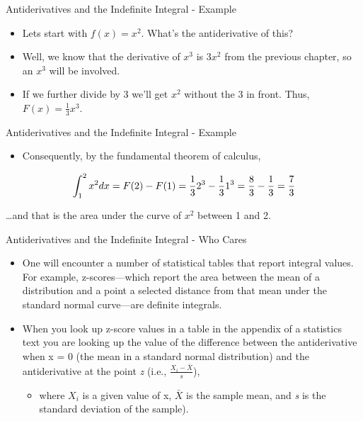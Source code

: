 \documentclass[
  ignorenonframetext,
]{beamer}
\providecommand{\tightlist}{%
  \setlength{\itemsep}{0pt}\setlength{\parskip}{0pt}}
\begin{document}
\begin{frame}{Antiderivatives and the Indefinite Integral - Example}
\protect\hypertarget{antiderivatives-and-the-indefinite-integral---example}{}

\begin{itemize}
\item
  Lets start with \(f(x) = x^{2}\). What's the antiderivative of this?
\item
  Well, we know that the derivative of \(x^{3}\) is \(3x^{2}\) from the
  previous chapter, so an \(x^{3}\) will be involved.
\item
  If we further divide by 3 we'll get \(x^{2}\) without the 3 in front.
  Thus, \(F(x) = \frac{1}{3}x^{3}\).
\end{itemize}

\end{frame}

\begin{frame}{Antiderivatives and the Indefinite Integral - Example}
\protect\hypertarget{antiderivatives-and-the-indefinite-integral---example-1}{}

\begin{itemize}
\tightlist
\item
  Consequently, by the fundamental theorem of calculus,
\end{itemize}

\[\int_{1}^{2}x^{2}dx = F(2) - F(1) = \\
\frac{1}{3}2^{3} - \frac{1}{3}1^{3} = \\
\frac{8}{3}- \frac{1}{3} = \frac{7}{3}\]

\ldots and that is the area under the curve of \(x^{2}\) between 1 and
2.

\end{frame}

\begin{frame}{Antiderivatives and the Indefinite Integral - Who Cares}
\protect\hypertarget{antiderivatives-and-the-indefinite-integral---who-cares}{}

\begin{itemize}
\item
  One will encounter a number of statistical tables that report integral
  values. For example, z-scores---which report the area between the mean
  of a distribution and a point a selected distance from that mean under
  the standard normal curve---are definite integrals.
\item
  When you look up z-score values in a table in the appendix of a
  statistics text you are looking up the value of the difference between
  the antiderivative when x = 0 (the mean in a standard normal
  distribution) and the antiderivative at the point \emph{z} (i.e.,
  \(\frac{X_{i} -\bar{X}}{s}\)),

  \begin{itemize}
  \tightlist
  \item
    where \(X_{i}\) is a given value of x, \(\bar{X}\) is the sample
    mean, and \emph{s} is the standard deviation of the sample).
  \end{itemize}
\end{itemize}

\end{frame}
\end{document}

